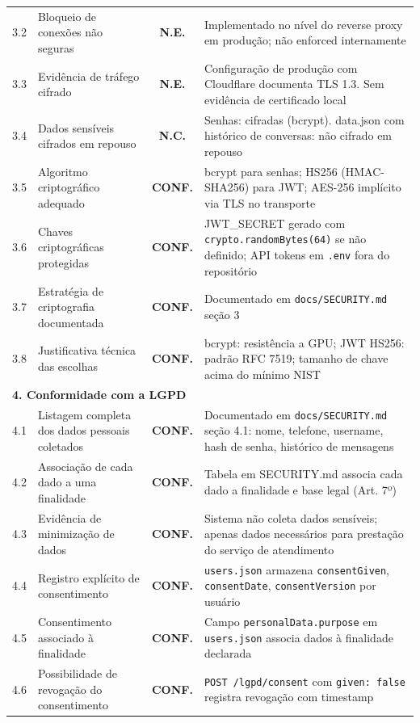 \documentclass[11pt, a4paper]{article}
\newcommand{\conf}{\textcolor{conf}{\textbf{CONF.}}}
\newcommand{\nconf}{\textcolor{nc}{\textbf{N.C.}}}
\newcommand{\neve}{\textcolor{ne}{\textbf{N.E.}}}
\begin{document}
\begin{longtable}{p{0.8cm}p{5.5cm}cp{8.2cm}}
3.2 & Bloqueio de conexões não seguras & \neve & Implementado no nível do reverse proxy em produção; não enforced internamente \\
3.3 & Evidência de tráfego cifrado & \neve & Configuração de produção com Cloudflare documenta TLS 1.3. Sem evidência de certificado local \\
3.4 & Dados sensíveis cifrados em repouso & \nconf & Senhas: cifradas (bcrypt). data.json com histórico de conversas: não cifrado em repouso \\
3.5 & Algoritmo criptográfico adequado & \conf & bcrypt para senhas; HS256 (HMAC-SHA256) para JWT; AES-256 implícito via TLS no transporte \\
3.6 & Chaves criptográficas protegidas & \conf & JWT\_SECRET gerado com \texttt{crypto.randomBytes(64)} se não definido; API tokens em \texttt{.env} fora do repositório \\
3.7 & Estratégia de criptografia documentada & \conf & Documentado em \texttt{docs/SECURITY.md} seção 3 \\
3.8 & Justificativa técnica das escolhas & \conf & bcrypt: resistência a GPU; JWT HS256: padrão RFC 7519; tamanho de chave acima do mínimo NIST \\
\midrule
\multicolumn{4}{l}{\textbf{4. Conformidade com a LGPD}} \\
\midrule
4.1 & Listagem completa dos dados pessoais coletados & \conf & Documentado em \texttt{docs/SECURITY.md} seção 4.1: nome, telefone, username, hash de senha, histórico de mensagens \\
4.2 & Associação de cada dado a uma finalidade & \conf & Tabela em SECURITY.md associa cada dado a finalidade e base legal (Art. 7º) \\
4.3 & Evidência de minimização de dados & \conf & Sistema não coleta dados sensíveis; apenas dados necessários para prestação do serviço de atendimento \\
4.4 & Registro explícito de consentimento & \conf & \texttt{users.json} armazena \texttt{consentGiven}, \texttt{consentDate}, \texttt{consentVersion} por usuário \\
4.5 & Consentimento associado à finalidade & \conf & Campo \texttt{personalData.purpose} em \texttt{users.json} associa dados à finalidade declarada \\
4.6 & Possibilidade de revogação do consentimento & \conf & \texttt{POST /lgpd/consent} com \texttt{given: false} registra revogação com timestamp \\

\end{longtable}
\end{document}
